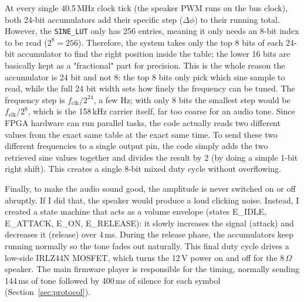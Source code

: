 \documentclass[a4paper,10pt]{article}
\begin{document}
At every single 40.5\,MHz clock tick (the speaker PWM runs on the bus clock), both 24-bit
 accumulators add their specific step ($\Delta\phi$) to their running total.
 However, the \texttt{SINE\_LUT} only has 256 entries, meaning it 
 only needs an 8-bit index to be read ($2^8 = 256$). 
 Therefore, the system takes only the top 8 bits of each 24-bit
 accumulator to find the right position inside the table;
 the lower 16 bits are basically kept as a "fractional" part
  for precision. This is the whole reason the accumulator is 24 bit and not 8: the top 8
  bits only pick which sine sample to read, while the full 24 bit width sets how finely the
  frequency can be tuned. The frequency step is $f_\mathrm{clk}/2^{24}$, a few Hz; with only
  8 bits the smallest step would be $f_\mathrm{clk}/2^{8}$, which is the 158\,kHz carrier
  itself, far too coarse for an audio tone. Since FPGA hardware can run parallel tasks,
  the code actually reads two different values from the exact 
  same table at the exact same time. To send these two different
   frequencies to a single output pin, the code simply adds the two
    retrieved sine values together and divides the result by 2 
    (by doing a simple 1-bit right shift). 
    This creates a single 8-bit mixed duty cycle without overflowing.

Finally, to make the audio sound good, the amplitude is never switched on or off abruptly. If I did that, the speaker would produce a loud clicking noise. Instead, I created a state machine that acts as a volume envelope (states E\_IDLE, E\_ATTACK, E\_ON, E\_RELEASE): it slowly increases the signal (attack) and decreases it (release) over 4\,ms. During the release phase, the accumulators keep running normally so the tone fades out naturally. This final duty cycle drives a low-side IRLZ44N MOSFET, which turns the 12\,V power on and off for the 8\,$\Omega$ speaker. The main firmware player is responsible for the timing, normally sending 144\,ms of tone followed by 400\,ms of silence for each symbol (Section~\ref{sec:protocol}).
\end{document}

